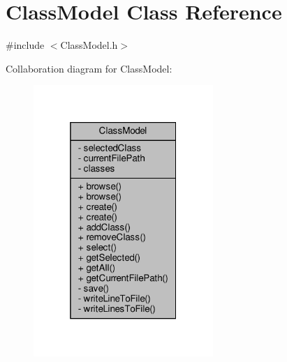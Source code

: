 \hypertarget{classClassModel}{}\section{Class\+Model Class Reference}
\label{classClassModel}


{\ttfamily \#include $<$Class\+Model.\+h$>$}



Collaboration diagram for Class\+Model\+:\nopagebreak
\begin{figure}[H]
\begin{center}
\leavevmode
\includegraphics[width=193pt]{classClassModel__coll__graph}
\end{center}
\end{figure}
